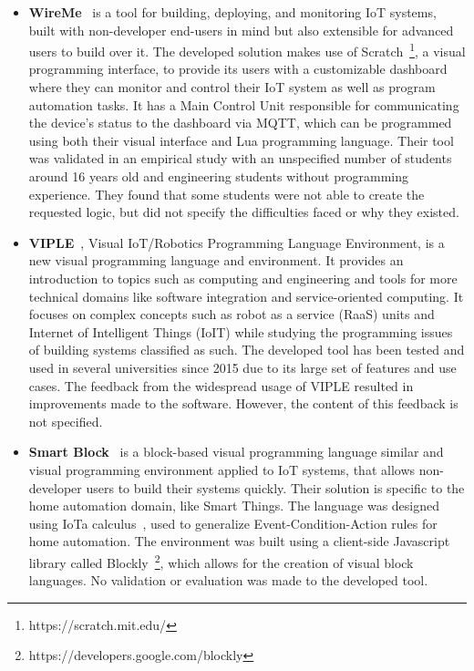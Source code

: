 \begin{itemize}
\item\textbf{WireMe}~\cite{wireme} is a tool for building, deploying, and monitoring IoT systems, built with non-developer end-users in mind but also extensible for advanced users to build over it. The developed solution makes use of Scratch~\footnote{https://scratch.mit.edu/}, a visual programming interface, to provide its users with a customizable dashboard where they can monitor and control their IoT system as well as program automation tasks. It has a Main Control Unit responsible for communicating the device's status to the dashboard via MQTT, which can be programmed using both their visual interface and Lua programming language. Their tool was validated in an empirical study with an unspecified number of students around 16 years old and engineering students without programming experience. They found that some students were not able to create the requested logic, but did not specify the difficulties faced or why they existed.

\item\textbf{VIPLE}~\cite{viple}, Visual IoT/Robotics Programming Language Environment, is a new visual programming language and environment. It provides an introduction to topics such as computing and engineering and tools for more technical domains like software integration and service-oriented computing. It focuses on complex concepts such as robot as a service (RaaS) units and Internet of Intelligent Things (IoIT) while studying the programming issues of building systems classified as such. The developed tool has been tested and used in several universities since 2015 due to its large set of features and use cases. The feedback from the widespread usage of VIPLE resulted in improvements made to the software. However, the content of this feedback is not specified.

\item\textbf{Smart Block}~\cite{smart_block} is a block-based visual programming language similar and visual programming environment applied to IoT systems, that allows non-developer users to build their systems quickly. Their solution is specific to the home automation domain, like Smart Things. The language was designed using IoTa calculus~\cite{iota_calculus}, used to generalize Event-Condition-Action rules for home automation. The environment was built using a client-side Javascript library called Blockly~\footnote{https://developers.google.com/blockly}, which allows for the creation of visual block languages. No validation or evaluation was made to the developed tool.


\end{itemize}
